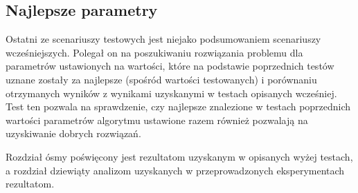 \subsection{Najlepsze parametry}
Ostatni ze scenariuszy testowych jest niejako podsumowaniem scenariuszy wcześniejszych. Polegał on na poszukiwaniu rozwiązania problemu dla parametrów ustawionych na wartości, które na podstawie poprzednich testów uznane zostały za najlepsze (spośród wartości testowanych) i porównaniu otrzymanych wyników z wynikami uzyskanymi w testach opisanych wcześniej. Test ten pozwala na sprawdzenie, czy najlepsze znalezione w testach poprzednich wartości parametrów algorytmu ustawione razem również pozwalają na uzyskiwanie dobrych rozwiązań.

Rozdział ósmy poświęcony jest rezultatom uzyskanym w opisanych wyżej testach, a rozdział dziewiąty analizom uzyskanych w przeprowadzonych eksperymentach rezultatom. 